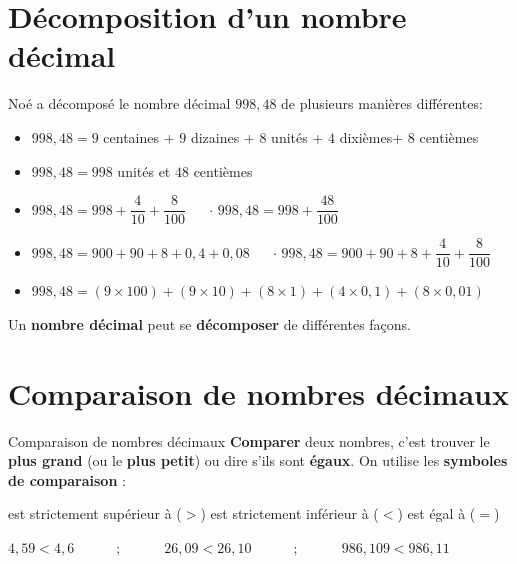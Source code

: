 \begin{pageCours} 

\section{Décomposition d'un nombre décimal}

\begin{Ex}
Noé a décomposé le nombre décimal $998,48$ de plusieurs manières différentes:
\begin{itemize}[leftmargin=*]
\item $998,48=9$ centaines + $9$ dizaines + $8$ unités + $4$ dixièmes+ $8$ centièmes
\item $998,48=998$ unités et $48$ centièmes 
\item $998,48=998+\dfrac{4}{10}+\dfrac{8}{100}$ $\quad$ $\cdot$ $998,48=998+\dfrac{48}{100}$
\item $998,48=900+90+8+0,4+0,08$ $\quad$ $\cdot$ $998,48=900+90+8+\dfrac{4}{10}+\dfrac{8}{100}$
\item $998,48=(9\times100)+(9\times10)+(8\times1)+(4\times0,1)+(8\times0,01)$
\end{itemize}
\end{Ex}

\begin{Prop}
Un \textbf{nombre décimal} peut se \textbf{décomposer} de différentes façons.
\end{Prop}


\section{Comparaison de nombres décimaux}

\begin{DefT}{Comparaison de nombres décimaux}  
\textbf{Comparer} deux nombres, c'est trouver le \textbf{plus grand} (ou le \textbf{plus petit}) ou dire s'ils sont \textbf{égaux}.
On utilise les \textbf{symboles de comparaison} : 

est strictement supérieur à ($>$) \hspace{0.3cm} est strictement inférieur à ($<$) \hspace{0.3cm} est égal à ($=$)
\end{DefT}

\begin{Ex}
$4,59 < 4,6 \quad\quad\quad ; \quad\quad\quad  26,09 < 26,10  \quad\quad\quad ; \quad\quad\quad  986,109 < 986,11$
\end{Ex} 


\end{pageCours}
